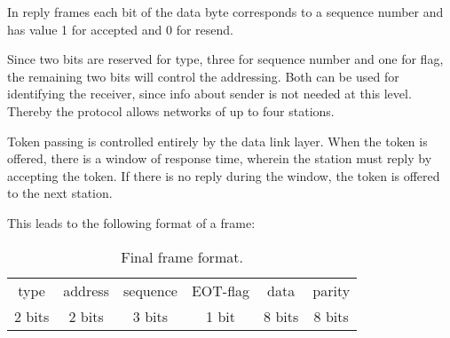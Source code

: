 
In reply frames each bit of the data byte corresponds to a
sequence number and has value 1 for accepted and 0 for resend.

Since two bits are reserved for type, three for sequence number and one for flag,
the remaining two bits will control the addressing. Both can be used
for identifying the receiver, since info about sender is not needed at this
level. Thereby the protocol allows networks of up to four stations.

Token passing is controlled entirely by the data link layer. When the token is
offered, there is a window of response time, wherein the station must reply by accepting
the token. If there is no reply during the window, the token is offered to the
next station. 

This leads to the following format of a frame: 

\begin{table}[htb]
 \centering
 \begin{tabular}{|c|c|c|c|c|c|}
  \hline
  type & address & sequence & EOT-flag & data & parity \\
  2 bits & 2 bits & 3 bits & 1 bit & 8 bits & 8 bits\\
  \hline
 \end{tabular}
 \caption{Final frame format.}
 \label{tab:final_frame_format}
\end{table}
